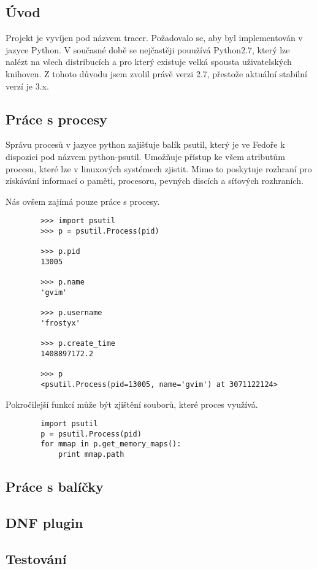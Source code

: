 \documentclass[10pt,a4paper]{article}
\begin{document}
		\subsection{Úvod}
		Projekt je vyvíjen pod názvem tracer. Požadovalo se, aby byl implementován v jazyce Python. V současné době se nejčastěji pouužívá Python2.7, který lze nalézt na všech distribucích a pro který existuje velká spousta uživatelských knihoven. Z tohoto důvodu jsem zvolil právě verzi 2.7, přestože aktuální stabilní verzí je 3.x.		
		
		\subsection{Práce s procesy}
		Správu procesů v jazyce python zajišťuje balík psutil, který je ve Fedoře k dispozici pod názvem python-psutil. Umožňuje přístup ke všem atributům procesu, které lze v linuxových systémech zjistit. Mimo to poskytuje rozhraní pro získávání informací o paměti, procesoru, pevných discích a síťových rozhraních.		

		Nás ovšem zajímá pouze práce s procesy.

		\begin{verbatim}
		>>> import psutil
		>>> p = psutil.Process(pid)

		>>> p.pid
		13005

		>>> p.name
		'gvim'

		>>> p.username
		'frostyx'

		>>> p.create_time
		1408897172.2

		>>> p
		<psutil.Process(pid=13005, name='gvim') at 3071122124>

		\end{verbatim}
		
		Pokročilejší funkcí může být zjištění souborů, které proces využívá.
		
		\begin{verbatim}
		import psutil
		p = psutil.Process(pid)
		for mmap in p.get_memory_maps():
		    print mmap.path
		\end{verbatim}
				
		\subsection{Práce s balíčky}
		\subsection{DNF plugin}
		\subsection{Testování}
\end{document}
